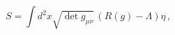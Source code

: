 \begin{equation}
S
=
\int d^2x \sqrt{\det g_{\mu\nu}} \, \left( R(g) - \Lambda \right) \eta
\, ,
\end{equation}

